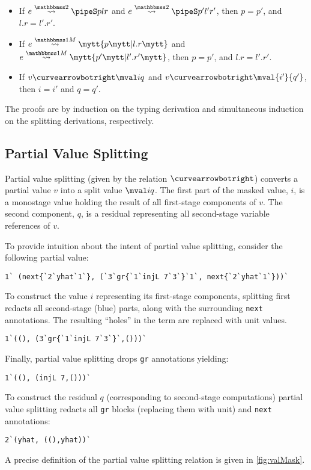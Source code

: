 \begin{abstrsyn}
\begin{theorem} \leavevmode
\label{thm:unique}
\begin{itemize} 
\item If $\splittwo e A p l r$ and $\splittwo e A {p'} {l'} {r'}$, then $p = p'$, and $l.r = l'.r'$.
\item If $\splitone e A p {l.r}$ and $\splitone e A {p'} {l'.r'}$, then $p = p'$, and $l.r = l'.r'$.
\item If $v \vsplito \mval i q$ and $v \vsplito \mval {i'} {q'}$, then $i = i'$ and $q = q'$.
\end{itemize}
\end{theorem}

The proofs are by induction on the typing derivation
and simultaneous induction on the splitting derivations, respectively.

\subsection{Partial Value Splitting}
\label{sec:masking}

Partial value splitting (given by the relation $\vsplito$) converts a 
partial value $v$ into a split value $\mval i q$.
The first part of the masked value, $i$, is a monostage value holding
the result of all first-stage components of $v$.  The second
component, $q$, is a residual representing all second-stage
variable references of $v$.

To provide intuition about the intent of partial value splitting, consider the
following partial value:
\begin{lstlisting}
1` (next{`2`yhat`1`}, (`3`gr{`1`injL 7`3`}`1`, next{`2`yhat`1`}))`
\end{lstlisting}
To construct the value $i$ representing its first-stage components,
splitting first redacts all second-stage (blue) parts, along with the
surrounding \texttt{next} annotations. 
The resulting ``holes'' in the term are replaced with
unit values.
\begin{lstlisting}
1`((), (3`gr{`1`injL 7`3`}`,()))`
\end{lstlisting}
Finally, partial value splitting drops \texttt{gr} annotations yielding:
\begin{lstlisting}
1`((), (injL 7,()))`
\end{lstlisting}
To construct the residual $q$ (corresponding to second-stage computations) partial value splitting redacts all \texttt{gr} blocks
(replacing them with unit) and \texttt{next} annotations:
\begin{lstlisting}
2`(yhat, ((),yhat))`
\end{lstlisting}
A precise definition of the partial value splitting relation is given in
\ref{fig:valMask}.


\end{abstrsyn}
